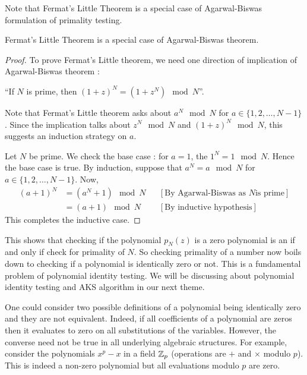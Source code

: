 Note that Fermat's Little Theorem is a special case of Agarwal-Biswas
formulation of primality testing.
\begin{claim}
Fermat's Little Theorem is a special case of Agarwal-Biswas theorem.
\end{claim}
\begin{proof}
	To prove Fermat's Little theorem, we need one direction of implication
	of Agarwal-Biswas theorem : 
	\begin{center}
	``If $N$ is prime, then $(1+z)^N = (1+z^N) \mod N$''.
	\end{center}

	Note that Fermat's Little theorem asks about $a^N \mod N$ for $a \in
	\{1,2,\ldots,N-1\}$. Since the implication talks about $z^N \mod N$
	and $(1+z)^N \mod N$, this suggests an induction strategy on $a$.

	Let $N$ be prime. We check the base case : for $a=1$, the
	$1^N =1 \mod N$. Hence the base case is true. By induction, suppose
	that $a^N = a \mod N$ for $a \in \{1,2,\ldots, N-1\}$. Now, 
	\begin{align*}
		(a+1)^N & = (a^N +1) \mod N && [\text{By Agarwal-Biswas as $N$
		is prime}]\\
		& = (a+1) \mod N && [\text{By inductive hypothesis}]
	\end{align*}
	This completes the inductive case. 
\end{proof}

This shows that checking if the polynomial $p_N(z)$ is a zero polynomial is an if and only if check for primality of $N$. 
So checking primality of a number now boils down to checking if a polynomial is identically zero or not. This is a fundamental problem of polynomial identity testing. We will be discussing about polynomial identity testing and AKS algorithm in our next theme.

\begin{remark}
One could consider two possible definitions of a polynomial being identically zero and they are not equivalent. Indeed, if all coefficients of a polynomial are zeros then it evaluates to zero on all substitutions of the variables. However, the converse need not be true in all underlying algebraic structures. For example, consider the polynomials $x^p -  x$ in a field ${\mathbb{Z}}_p$ (operations are $+$ and $\times$ modulo $p$). This is indeed a non-zero polynomial but all evaluations modulo $p$ are zero.
\end{remark}
